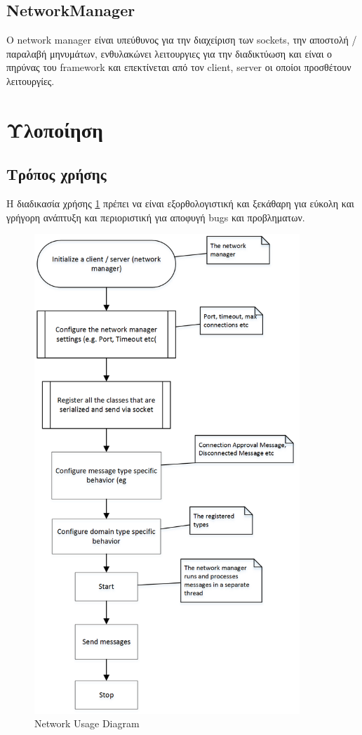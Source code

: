 		\subsection{NetworkManager}
		Ο network manager είναι υπεύθυνος για την διαχείριση των sockets, την αποστολή / παραλαβή μηνυμάτων, ενθυλακώνει λειτουργιες για την διαδικτύωση και είναι ο πηρύνας του framework και επεκτίνεται από τον client, server οι οποίοι προσθέτουν λειτουργίες.
			
		\section{Υλοποίηση}	
		\subsection{Τρόπος χρήσης}
		Η διαδικασία χρήσης \ref{fig:Network_Usage_Diagram} πρέπει να είναι εξορθολογιστική και ξεκάθαρη για εύκολη και γρήγορη ανάπτυξη και περιοριστική για αποφυγή bugs και προβληματων.
		\begin{figure}
			\centering
			\includegraphics[width=100mm]{Images/network_usage_diagram}
			\caption{Network Usage Diagram}
			\label{fig:Network_Usage_Diagram}
		\end{figure}	
					
